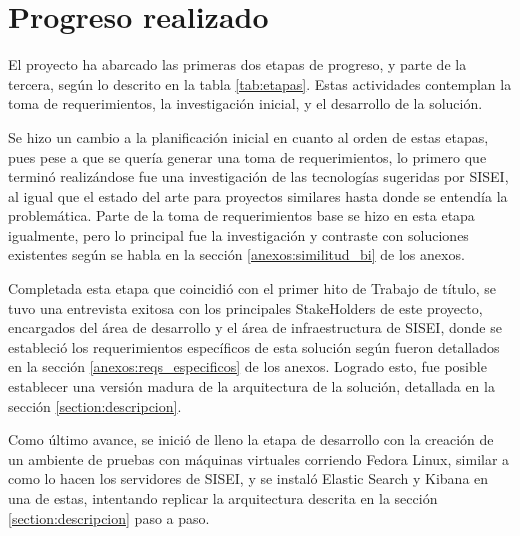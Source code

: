 \section{Progreso realizado}


El proyecto ha abarcado las primeras dos etapas de progreso, y parte de la tercera, según lo descrito en la tabla \ref{tab:etapas}. Estas actividades contemplan la toma de requerimientos, la investigación inicial, y el desarrollo de la solución.

Se hizo un cambio a la planificación inicial en cuanto al orden de estas etapas, pues pese a que se quería generar una toma de requerimientos, lo primero que terminó realizándose fue una investigación de las tecnologías sugeridas por SISEI, al igual que el estado del arte para proyectos similares hasta donde se entendía la problemática. Parte de la toma de requerimientos base se hizo en esta etapa igualmente, pero lo principal fue la investigación y contraste con soluciones existentes según se habla en la sección \ref{anexos:similitud_bi} de los anexos.

Completada esta etapa que coincidió con el primer hito de Trabajo de título, se tuvo una entrevista exitosa con los principales StakeHolders de este proyecto, encargados del área de desarrollo y el área de infraestructura de SISEI, donde se estableció los requerimientos específicos de esta solución según fueron detallados en la sección \ref{anexos:reqs_especificos} de los anexos. Logrado esto, fue posible establecer una versión madura de la arquitectura de la solución, detallada en la sección \ref{section:descripcion}.

Como último avance, se inició de lleno la etapa de desarrollo con la creación de un ambiente de pruebas con máquinas virtuales corriendo Fedora Linux, similar a como lo hacen los servidores de SISEI, y se instaló Elastic Search y Kibana en una de estas, intentando replicar la arquitectura descrita en la sección \ref{section:descripcion} paso a paso.

\clearpage
